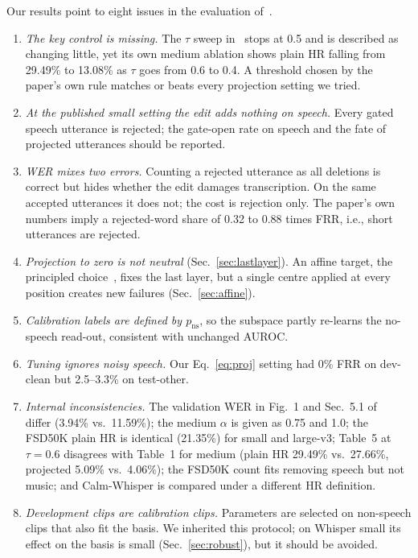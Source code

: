 \documentclass[conference,a4paper]{IEEEtran}
\newcommand{\pns}{p_{\mathrm{ns}}}
\begin{document}
Our results point to eight issues in the evaluation of~\cite{abbasi2026hsp}.
\begin{enumerate}
\item \emph{The key control is missing.} The $\tau$ sweep in~\cite{abbasi2026hsp} stops at 0.5 and is described as changing little, yet its own medium ablation shows plain HR falling from 29.49\% to 13.08\% as $\tau$ goes from 0.6 to 0.4. A threshold chosen by the paper's own rule matches or beats every projection setting we tried.
\item \emph{At the published small setting the edit adds nothing on speech.} Every gated speech utterance is rejected; the gate-open rate on speech and the fate of projected utterances should be reported.
\item \emph{WER mixes two errors.} Counting a rejected utterance as all deletions is correct but hides whether the edit damages transcription. On the same accepted utterances it does not; the cost is rejection only. The paper's own numbers imply a rejected-word share of 0.32 to 0.88 times FRR, i.e., short utterances are rejected.
\item \emph{Projection to zero is not neutral} (Sec.~\ref{sec:lastlayer}). An affine target, the principled choice~\cite{belrose2023leace}, fixes the last layer, but a single centre applied at every position creates new failures (Sec.~\ref{sec:affine}).
\item \emph{Calibration labels are defined by $\pns$}, so the subspace partly re-learns the no-speech read-out, consistent with unchanged AUROC.
\item \emph{Tuning ignores noisy speech.} Our Eq.~\eqref{eq:proj} setting had 0\% FRR on dev-clean but 2.5--3.3\% on test-other.
\item \emph{Internal inconsistencies.} The validation WER in Fig.~1 and Sec.~5.1 of~\cite{abbasi2026hsp} differ (3.94\% vs.\ 11.59\%); the medium $\alpha$ is given as 0.75 and 1.0; the FSD50K plain HR is identical (21.35\%) for small and large-v3; Table~5 at $\tau = 0.6$ disagrees with Table~1 for medium (plain HR 29.49\% vs.\ 27.66\%, projected 5.09\% vs.\ 4.06\%); the FSD50K count fits removing speech but not music; and Calm-Whisper is compared under a different HR definition.
\item \emph{Development clips are calibration clips.} Parameters are selected on non-speech clips that also fit the basis. We inherited this protocol; on Whisper small its effect on the basis is small (Sec.~\ref{sec:robust}), but it should be avoided.
\end{enumerate}
\end{document}
